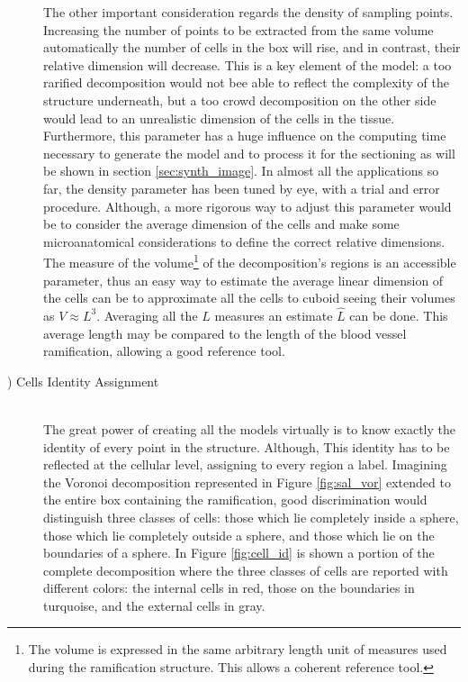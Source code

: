 \begin{description}
    The other important consideration regards the density of sampling points. Increasing the number of points to be extracted from the same volume automatically the number of cells in the box will rise, and in contrast, their relative dimension will decrease. This is a key element of the model: a too rarified decomposition would not bee able to reflect the complexity of the structure underneath, but a too crowd decomposition on the other side would lead to an unrealistic dimension of the cells in the tissue. Furthermore, this parameter has a huge influence on the computing time necessary to generate the model and to process it for the sectioning as will be shown in section \ref{sec:synth_image}. In almost all the applications so far, the density parameter has been tuned by eye, with a trial and error procedure. Although, a more rigorous way to adjust this parameter would be to consider the average dimension of the cells and make some microanatomical considerations to define the correct relative dimensions. The measure of the volume\footnote{The volume is expressed in the same arbitrary length unit of measures used during the ramification structure. This allows a coherent reference tool.} of the decomposition's regions is an accessible parameter, thus an easy way to estimate the average linear dimension of the cells can be to approximate all the cells to cuboid seeing their volumes as $V \approx L^3$. Averaging all the $L$ measures an estimate $\hat{L}$ can be done. This average length may be compared to the length of the blood vessel ramification, allowing a good reference tool.

    \item [\mycount) Cells Identity Assignment] \hfill \\
    The great power of creating all the models virtually is to know exactly the identity of every point in the structure. Although, This identity has to be reflected at the cellular level, assigning to every region a label. Imagining the Voronoi decomposition represented in Figure  \ref{fig:sal_vor} extended to the entire box containing the ramification, good discrimination would distinguish three classes of cells: those which lie completely inside a sphere, those which lie completely outside a sphere, and those which lie on the boundaries of a sphere. In Figure \ref{fig:cell_id} is shown a portion of the complete decomposition where the three classes of cells are reported with different colors: the internal cells in red, those on the boundaries in turquoise, and the external cells in gray.


\end{description}

